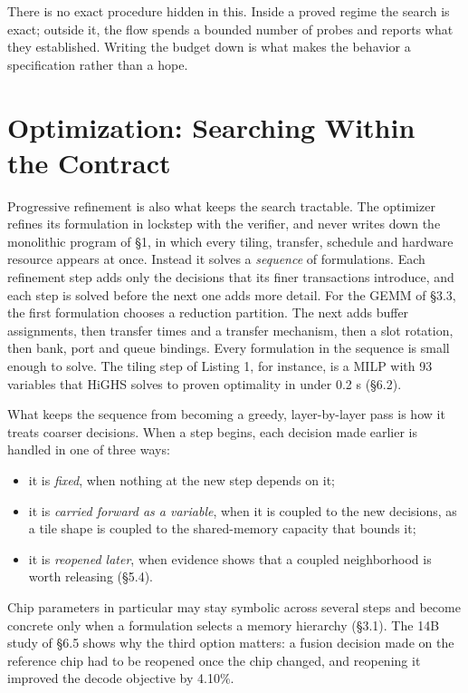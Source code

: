 \documentclass[11pt]{article}
\providecommand{\tightlist}{\setlength{\itemsep}{0pt}\setlength{\parskip}{0pt}}
\begin{document}
There is no exact procedure hidden in this. Inside a proved regime the search is exact; outside it, the flow spends a bounded number of probes and reports what they established. Writing the budget down is what makes the behavior a specification rather than a hope.

\hypertarget{optimization-searching-within-the-contract}{%
\section{Optimization: Searching Within the Contract}\label{optimization-searching-within-the-contract}}

Progressive refinement is also what keeps the search tractable. The optimizer refines its formulation in lockstep with the verifier, and never writes down the monolithic program of §1, in which every tiling, transfer, schedule and hardware resource appears at once. Instead it solves a \emph{sequence} of formulations. Each refinement step adds only the decisions that its finer transactions introduce, and each step is solved before the next one adds more detail. For the GEMM of §3.3, the first formulation chooses a reduction partition. The next adds buffer assignments, then transfer times and a transfer mechanism, then a slot rotation, then bank, port and queue bindings. Every formulation in the sequence is small enough to solve. The tiling step of Listing 1, for instance, is a MILP with 93 variables that HiGHS solves to proven optimality in under 0.2 s (§6.2).

What keeps the sequence from becoming a greedy, layer-by-layer pass is how it treats coarser decisions. When a step begins, each decision made earlier is handled in one of three ways:

\begin{itemize}
\tightlist
\item
  it is \emph{fixed}, when nothing at the new step depends on it;
\item
  it is \emph{carried forward as a variable}, when it is coupled to the new decisions, as a tile shape is coupled to the shared-memory capacity that bounds it;
\item
  it is \emph{reopened later}, when evidence shows that a coupled neighborhood is worth releasing (§5.4).
\end{itemize}

Chip parameters in particular may stay symbolic across several steps and become concrete only when a formulation selects a memory hierarchy (§3.1). The 14B study of §6.5 shows why the third option matters: a fusion decision made on the reference chip had to be reopened once the chip changed, and reopening it improved the decode objective by 4.10\%.
\end{document}
